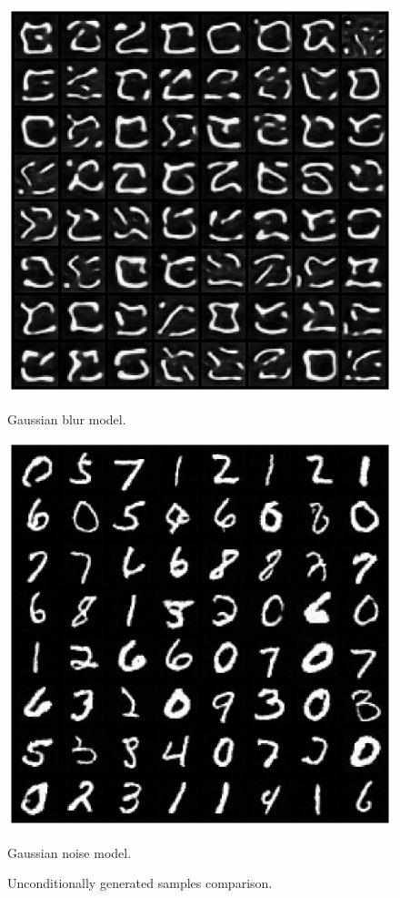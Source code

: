 \documentclass[11pt]{article}
\begin{document}
\begin{figure}[H]
    \centering
    \begin{minipage}{.4\textwidth}
        \centering
        \includegraphics[width=0.9\linewidth]{figs/q2c_blur_uncond_samples_64.png}
        \caption{Gaussian blur model.}
        \label{fig:uncond_blur}
    \end{minipage}
    \begin{minipage}{.4\textwidth}
        \centering
        \includegraphics[width=0.9\linewidth]{figs/q2c_ddpm_uncond_samples_64.png}
        \caption{Gaussian noise model.}
        \label{fig:uncond_ddpm}
    \end{minipage}
    \caption{Unconditionally generated samples comparison.}
    \label{fig:q2c_unconditional_samples}
\end{figure}
\end{document}
